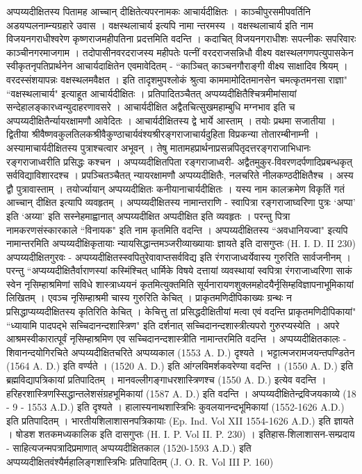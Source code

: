 अप्पय्यदीक्षितस्य पितामह आच्चान् दीक्षितेत्यपरनामकः आचार्यदीक्षितः । काञ्चीपुरसमीपवर्तिनि अडयप्पलनाम्न्यग्रहारे उवास । वक्षस्थलाचार्य इत्यपि नामा न्तरमस्य । वक्षस्थलाचार्य इति नाम विजयनगराधीश्वरेण कृष्णराजमहीपतिना प्रदत्तमिति वदन्ति । कदाचित् विजयनगराधीशः सपत्नीकः सपरिवारः काञ्चीनगरमाजगाम । तदोपासीनवरदराजस्य महीपतेः पत्नीं वरदराजसन्निधौ वीक्ष्य वक्षस्थलगणपत्युपासकेन स्वीकृतनृपतिप्रार्थनेन आचार्यदाक्षितेन एवमावेदितम् - ``काञ्चित् काञ्चनगौराङ्गी वीक्ष्य साक्षादिव श्रियम् । वरदस्संशयापन्नः वक्षस्थलमवैक्षत । इति तादृशमुपश्लोकं श्रुत्वा काममामोदितमानसेन चमत्कृतमनसा राज्ञा" ``वक्षस्थलाचार्य" इत्याहूत आचार्यदीक्षितः । प्रतिपादितञ्चैतत् अप्पय्यदीक्षितैश्चित्रमीमांसायां सन्देहालङ्कारध्वन्युदाहरणावसरे । आचार्यदीक्षित अद्वैतचित्सुखमहाम्बुधि मग्नभाव इति च अप्पय्यदीक्षितैर्न्यायरक्षामणौ आवेदितः । आचार्यदीक्षितस्य द्वे भार्ये आस्ताम् । तयोः प्रथमा सजातीया । द्वितीया श्रीवैष्णवकुलतिलकश्रीवैकुण्ठाचार्यवंश्यश्रीरङ्गराजाचार्यदुहिता विप्रकन्या तोतारम्बीनाम्नी । अस्यामाचार्यदीक्षितस्य पुत्राश्चत्वार अभूवन् । तेषु मातामहप्रार्थनाप्रसन्नपितृदत्तरङ्गराजाभिधानः रङ्गराजाध्वरीति प्रसिद्धः कश्चन ।
अप्पय्यदीक्षितपिता रङ्गराजाध्वरी-
अद्वैतमुकुर-विवरणदर्पणादिप्रबन्धकृत् सर्वविद्याविशारदश्च । प्रपञ्चितञ्चैतत् न्यायरक्षामणौ अप्पय्यदीक्षितैः, नलचरिते नीलकण्ठदीक्षितैश्च । अस्य द्वौ पुत्रावास्ताम् । तयोर्ज्यायान् अप्पय्यदीक्षितः कनीयानाचार्यदीक्षितः । यस्य नाम कालक्रमेण विकृतिं गतं आच्चान् दीक्षित इत्यापि व्यवहृतम् ।
अप्पय्यदीक्षितस्य नामान्तराणि -
स्वापित्रा रङ्गराजाघ्वरिणा पुत्रः `अप्पा' इति `अय्या' इति सस्नेहमाह्वानात् अप्पय्यदीक्षित अप्पदीक्षित इति व्यवहृतः । परन्तु पित्रा नामकरणसंस्कारकाले ``विनायक" इति नाम कृतमिति वदन्ति । अप्पय्यदीक्षितस्य ``अवधानियज्वा" इत्यपि नामान्तरमिति अप्पय्यदीक्षिकृतायाः न्यायसिद्धान्तमञ्जरीव्याख्यायाः ज्ञायते इति दासगुप्तः (H. I. D. II 230)
अप्पय्यदीक्षितगुरवः -
अप्पय्यदीक्षितस्स्वपितुरेवावाप्तसर्वविद्य इति रंगराजाध्वर्येवास्य गुरुरिति सार्वजनीनम् । परन्तु ``अप्यय्यदीक्षितैर्वाराणस्यां कस्मिंश्चित् धार्मिके विषये दत्तायां व्यवस्थायां स्वपित्रा रंगराजाध्वरिणा साकं स्वेन नृसिम्हाश्रमिणां सविधे शास्त्राध्ययनं कृतमित्युक्तमिति सूर्यनारायणशुक्लमहोदयैर्नृसिम्हविज्ञापनाभूमिकायां लिखितम् । एवञ्च नृसिम्हाश्रमी चास्य गुरुरिति केचित् । प्राकृतमणिदीपिकाख्यः ग्रन्थः न प्रसिद्धाप्यय्यदीक्षितस्य कृतिरिति केचित् । केचित्तु तां प्रसिद्धदीक्षितीयां मत्वा एवं वदन्ति प्राकृतमणिदीपिकायां" ``ध्यायामि पादपद्भे सच्चिदानन्दशास्त्रिण" इति दर्शनात् सच्चिदानन्दशास्त्रीत्यपरो गुरुरप्यस्येति । अपरे आश्रमस्वीकारात्पूर्वं नृसिम्हाश्रमिण एव सच्चिदानन्दशास्त्रीति नामान्तरमिति वदन्ति ।
अप्पय्यदीक्षितकालः -
शिवानन्दयोगिरचिते अप्पय्यदीक्षितचरिते अप्पय्यकाल (1553 A. D.) दृश्यते । भट्टात्मजरामजयन्तपण्डितेन (1564 A. D.) इति वर्ण्यते । (1520 A. D.) इति आंग्लविमर्शकवरेण्या वदन्ति । (1550 A. D.) इति ब्रह्मविद्यापत्रिकायां प्रतिपादितम् । मानवल्लीगङ्गाधरशास्त्रिणश्च (1550 A. D.) इत्येव वदन्ति । हरिहरशास्त्रिणस्सिद्धान्तलेशसंग्रहभूमिकायां (1587 A. D.) इति वदन्ति । अप्पय्यदीक्षितेन्द्रविजयकाव्ये (18 - 9 - 1553 A.D.) इति दृश्यते । हालास्यनाथशास्त्रिभिः कुवलयानन्दभूमिकायां (1552-1626 A.D.) इति प्रतिपादितम् । भारतीयशिलाशासनपत्रिकायाः (Ep. Ind. Vol XII 1554-1626 A.D.) इति ज्ञायते । षोडश शतकमध्यकालिक इति दासगुप्तः (H. I. P. Vol II. P. 230) । इतिहास-शिलाशासन-सम्प्रदाय - साहित्यजन्मपत्रादिप्रमाणात् अप्पय्यदीक्षितकाल (1520-1593 A.D.) इति अप्पय्यदीक्षितवंश्यैर्महालिङ्गशास्त्रिभिः प्रतिपादितम् (J. O. R. Vol III P. 160)
